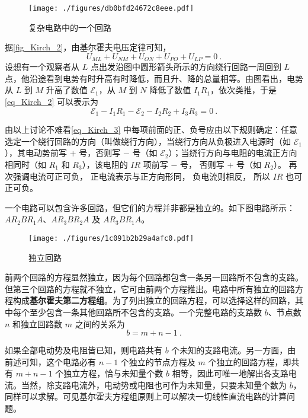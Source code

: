 \begin{example}{}
\begin{figure}[ht]
\centering
\texttt{[image: ./figures/db0bfd24672c8eee.pdf]}
\caption{复杂电路中的一个回路} \label{fig_Kirch_2}
\end{figure}

据\autoref{fig_Kirch_2}，由基尔霍夫电压定律可知，
\begin{equation} \label{eq_Kirch_2}
U_{M L}+U_{N M}+U_{O N}+U_{P O}+U_{L P}=0~.
\end{equation}
设想有一个观察者从 $L$ 点出发沿图中圆形箭头所示的方向绕行回路一周回到 $L $ 点，他沿途看到电势有时升高有时降低，而且升、降的总量相等。由图看出，电势从 $L $ 到 $M $ 升高了数值 $\mathscr E_1$，从 $M $ 到 $N $ 降低了数值 $I_1R_1$，依次类推，于是\autoref{eq_Kirch_2} 可以表示为
\begin{equation}\label{eq_Kirch_3}
\mathscr{E}_{1}-I_{1} R_{1}-\mathscr{E}_{2}-I_{2} R_{2}+I_{3} R_{3}=0~.
\end{equation}

由以上讨论不难看\autoref{eq_Kirch_3} 中每项前面的正、负号应由以下规则确定：任意选定一个绕行回路的方向（叫做绕行方向），当绕行方向从负极进入电源时（如 $\mathscr E_1$），其电动势前写 $+$ 号，否则写 $-$ 号（如 $\mathscr
E_2$）；当绕行方向与电阻的电流正方向相同时（如 $R_1$ 和 $R_3$），该电阻的 $IR$ 项前写 $-$ 号， 否则写 $+$ 号（如 $R_2$）。 再次强调电流可正可负， 正电流表示与正方向形同， 负电流则相反， 所以 $IR$ 也可正可负。
\end{example}

一个电路可以包含许多回路，但它们的方程并非都是独立的。如下图电路所示：$AR_2BR_1A$、$AR_3BR_2A$ 及 $AR_3BR_1A$。
\begin{figure}[ht]
\centering
\texttt{[image: ./figures/1c091b2b29a4afc0.pdf]}
\caption{独立回路} \label{fig_Kirch_3}
\end{figure}

前两个回路的方程显然独立，因为每个回路都包含一条另一回路所不包含的支路。但第三个回路的方程就不独立，它可由前两个方程推出。电路中所有独立的回路方程构成\textbf{基尔霍夫第二方程组}。为了列出独立的回路方程，可以选择这样的回路，其中每个至少包含一条其他回路所不包含的支路。一个完整电路的支路数 $b$、节点数 $n $ 和独立回路数 $m $ 之间的关系为
\begin{equation}
b=m+n-1~.
\end{equation}

如果全部电动势及电阻皆已知，则电路共有 $b $ 个未知的支路电流。另一方面，由前述可知，这个电路必有 $n-1 $ 个独立的节点方程及 $m $ 个独立的回路方程，即共有 $m + n -1$ 个独立方程，恰与未知量个数 $b $ 相等，因此可唯一地解出各支路电流。当然，除支路电流外，电动势或电阻也可作为未知量，只要未知量个数为 $b$，同样可以求解。可见基尔霍夫方程组原则上可以解决一切线性直流电路的计算问题。

